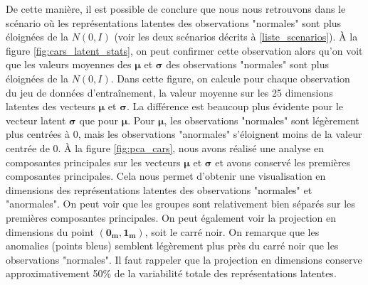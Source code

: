 De cette manière, il est possible de conclure que nous nous retrouvons dans le scénario où les représentations latentes des observations "normales" sont plus éloignées de la $N(0,I)$ (voir les deux scénarios décrits à \ref{liste_scenarios}). À la figure \ref{fig:cars_latent_stats}, on peut confirmer cette observation alors qu'on voit que les valeurs moyennes des $\boldsymbol{\mu}$ et $\boldsymbol{\sigma}$ des observations "normales" sont plus éloignées de la $N(0,I)$. Dans cette figure, on calcule pour chaque observation du jeu de données d'entraînement, la valeur moyenne sur les 25 dimensions latentes des vecteurs $\boldsymbol{\mu}$ et $\boldsymbol{\sigma}$. La différence est beaucoup plus évidente pour le vecteur latent $\boldsymbol{\sigma}$ que pour $\boldsymbol{\mu}$. Pour $\boldsymbol{\mu}$, les observations "normales" sont légèrement plus centrées à 0, mais les observations "anormales" s'éloignent moins de la valeur centrée de 0. À la figure \ref{fig:pca_cars}, nous avons réalisé une analyse en composantes principales sur les vecteurs $\boldsymbol{\mu}$ et $\boldsymbol{\sigma}$ et avons conservé les \DIFdelbegin {}\DIFdelend \DIFaddbegin {}\DIFaddend premières composantes principales. Cela nous permet d'obtenir une visualisation en \DIFdelbegin {}\DIFdelend \DIFaddbegin {}\DIFaddend dimensions des représentations latentes des observations "normales" et "anormales". On peut voir que les \DIFdelbegin {}\DIFdelend \DIFaddbegin {}\DIFaddend groupes sont relativement bien séparés sur les \DIFdelbegin {}\DIFdelend \DIFaddbegin {}\DIFaddend premières composantes principales. On peut également voir la projection en \DIFdelbegin {}\DIFdelend \DIFaddbegin {}\DIFaddend dimensions du point $(\boldsymbol{0_{m}}, \boldsymbol{1_{m}})$, soit le carré noir. On remarque que les anomalies (points bleus) semblent légèrement plus près du carré noir que les observations "normales". Il faut rappeler que la projection en \DIFdelbegin {}\DIFdelend \DIFaddbegin {}\DIFaddend dimensions conserve approximativement 50\% de la variabilité totale des représentations latentes.

